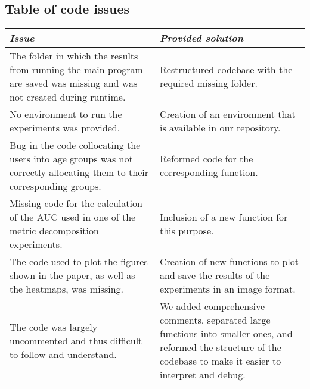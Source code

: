 \renewcommand{\thesubsection}{\textbf{\textcolor{black}{D}}}
\subsection{Table of code issues} \label{code_issues}

{\centering
\begin{tabular}{p{0.5\linewidth} | p{0.5\linewidth}}
 \emph{Issue} & \emph{Provided solution} \\ \hline \hline
 The folder in which the results from running the main program are saved was missing and was not created during runtime. & Restructured codebase with the required missing folder.    \\ \hline 
 No environment to run the experiments was provided. &  Creation of an environment that is available in our repository.  \\ \hline 
 Bug in the code collocating the users into age groups was not correctly allocating them to their corresponding groups.  & Reformed code for the corresponding function. \\ \hline 
 Missing code for the calculation of the AUC used in one of the metric decomposition experiments. & Inclusion of a new function for this purpose.\\ \hline 
 The code used to plot the figures shown in the paper, as well as the heatmaps, was missing. & Creation of new functions to plot and save the results of the experiments in an image format. \\ \hline 
 The code was largely uncommented and thus difficult to follow and understand. & We added comprehensive comments, separated large functions into smaller ones, and reformed the structure of the codebase to make it easier to interpret and debug. \\ \hline
\end{tabular}\par }

\renewcommand{\thesubsection}{\textbf{\textcolor{black}{E}}}
